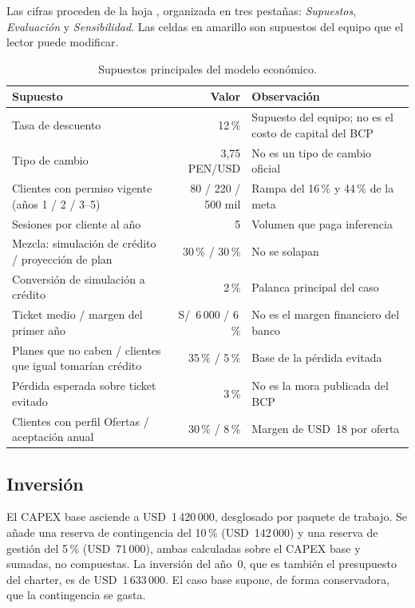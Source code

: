 \documentclass[11pt,a4paper]{article}
\newcommand{\usd}[1]{USD~#1}
\newcommand{\pen}[1]{S/~#1}
\begin{document}
Las cifras proceden de la hoja , organizada en tres pestañas: \textit{Supuestos}, \textit{Evaluación} y \textit{Sensibilidad}. Las celdas en amarillo son supuestos del equipo que el lector puede modificar.

\begin{table}[H]
\centering
\caption{Supuestos principales del modelo económico.}
\small
\begin{tabularx}{\textwidth}{@{}X r X@{}}
\toprule
\textbf{Supuesto} & \textbf{Valor} & \textbf{Observación} \\
\midrule
Tasa de descuento & 12\,\% & Supuesto del equipo; no es el costo de capital del BCP \\
Tipo de cambio & 3,75 PEN/USD & No es un tipo de cambio oficial \\
Clientes con permiso vigente (años 1 / 2 / 3--5) & 80 / 220 / 500 mil & Rampa del 16\,\% y 44\,\% de la meta \\
Sesiones por cliente al año & 5 & Volumen que paga inferencia \\
Mezcla: simulación de crédito / proyección de plan & 30\,\% / 30\,\% & No se solapan \\
Conversión de simulación a crédito & 2\,\% & Palanca principal del caso \\
Ticket medio / margen del primer año & \pen{6\,000} / 6\,\% & No es el margen financiero del banco \\
Planes que no caben / clientes que igual tomarían crédito & 35\,\% / 5\,\% & Base de la pérdida evitada \\
Pérdida esperada sobre ticket evitado & 3\,\% & No es la mora publicada del BCP \\
Clientes con perfil Ofertas / aceptación anual & 30\,\% / 8\,\% & Margen de \usd{18} por oferta \\
\bottomrule
\end{tabularx}
\end{table}

\subsection{Inversión}

El CAPEX base asciende a \usd{1\,420\,000}, desglosado por paquete de trabajo. Se añade una reserva de contingencia del 10\,\% (\usd{142\,000}) y una reserva de gestión del 5\,\% (\usd{71\,000}), ambas calculadas sobre el CAPEX base y sumadas, no compuestas. La inversión del año~0, que es también el presupuesto del charter, es de \usd{1\,633\,000}. El caso base supone, de forma conservadora, que la contingencia se gasta.
\end{document}
